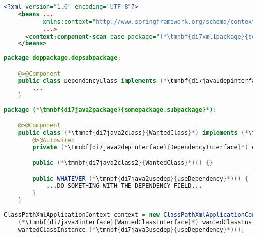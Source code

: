 \begin{lstlisting}[language=XML, title={Configuration XML}]
    <?xml version="1.0" encoding="UTF-8"?>
    <beans ...
           xmlns:context="http://www.springframework.org/schema/context"
           ...>
      <context:component-scan base-package="(*\tmnbf{di7xml1package}{somepackage.subpackage}[ForestGreen]*)"/>
    </beans>
\end{lstlisting}
\begin{lstlisting}[language=Java, title={Dependency class}]
    package deppackage.depsubpackage;

    @>@Component
    public class DependencyClass implements (*\tmnbf{di7java1depinterface}{DependencyInterface}*) {
        ...
    }
\end{lstlisting}
\begin{lstlisting}[language=Java, title={Wanted class with the zero--parameter constructor}]
    package (*\tmnbf{di7java2package}{somepackage.subpackage}*);

    @>@Component
    public class (*\tmnbf{di7java2class}{WantedClass}*) implements (*\tmnbf{di7java2interface}{WantedClassInterface}*) {
        @>@Autowired
        private (*\tmnbf{di7java2depinterface}{DependencyInterface}*) dependencyField;

        public (*\tmnbf{di7java2class2}{WantedClass}*)() {}

        public WHATEVER (*\tmnbf{di7java2usedep}{useDependency}*)() {
            ...DO SOMETHING WITH THE DEPENDENCY FIELD...
        }
    }
\end{lstlisting}
\begin{lstlisting}[language=Java, title={Usage}]
    ClassPathXmlApplicationContext context = new ClassPathXmlApplicationContext("configurationFile.xml");
    (*\tmnbf{di7java3interface}{WantedClassInterface}*) wantedClassInstance = context.getBean("(*\tmnbf{di7java3beanid}{wantedClass}[ForestGreen]*)", (*\tmnbf{di7java3interface2}{WantedClassInterface}*).class);
    wantedClassInstance.(*\tmnbf{di7java3usedep}{useDependency}*)();
\end{lstlisting}
\newpage

